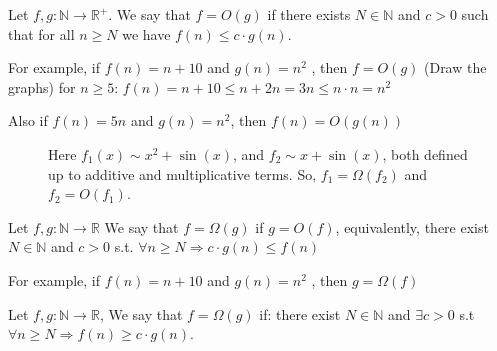 \begin{definition}
  Let \( f, g : \mathbb{N} \rightarrow \mathbb{R}^{+} \). We say that \( f = O(g)\)  if there exists $ N \in \mathbb{N}$ and $c > 0$  such that for all $n \ge N$ we have $f(n) \le c \cdot g(n)$. 
\end{definition}
\begin{example}
  For example, if \(f(n) = n + 10 \) and \( g(n) = n^2\)
, then \(f = O(g) \) (Draw the graphs) for \(n \ge 5 \):
\(f(n) = n + 10 \le n + 2n = 3n \le n \cdot n = n^2\)
\end{example}
\begin{example}
  Also if \( f(n) = 5n\) and \(g(n) = n^2\), then \(f(n) = O(g(n))\) 
\end{example}
\begin{figure}[h]
  \label{fig:bigO}
\caption{Here $f_{1} (x) \sim  x^{2} + \sin(x)$, and $f_{2} \sim x + \sin(x)$, both defined up to additive and multiplicative terms. So, $f_{1} = \Omega(f_{2})$ and $f_{2} = O(f_{1})$. } 
\end{figure}


\begin{definition} 
Let \( f, g : \mathbb{N} \rightarrow \mathbb{R} \)
We say that \(f = \Omega(g)\) if \(g = O(f)\), equivalently,
there exist $N \in \mathbb{N}$ and $ c > 0$ s.t. $\forall n \ge N \Rightarrow c· g(n) \le f(n)$
\end{definition}

\begin{example}
For example, if \(f(n) = n + 10\) and \(g(n) = n^2\)
, then \(g= \Omega(f)\)
\end{example}

\begin{definition} 
Let $ f, g : \mathbb{N} \rightarrow \mathbb{R}$, We say that $f = \Omega(g)$ if:
there exist $N \in \mathbb{N}$ and $\exists c > 0$ s.t $ \forall n \ge N \Rightarrow f(n) \ge c \cdot g(n)$.
\end{definition}



